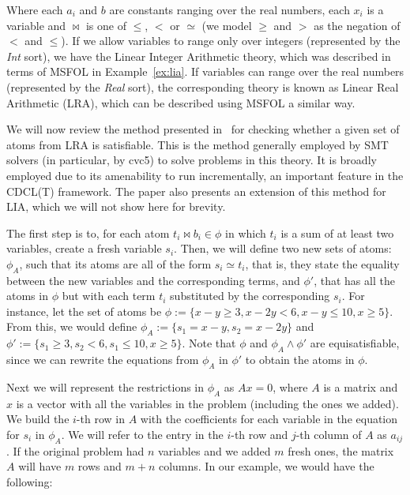 Where each $a_{i}$ and $b$ are constants ranging over the real numbers, each $x_{i}$ is a variable and $\bowtie$ is one of $\le$, $<$ or $\simeq$ (we model $\ge$ and $>$ as the negation of $<$ and $\le$). If we allow variables to range only over integers (represented by the \textit{Int} sort), we have the Linear Integer Arithmetic theory, which was described in terms of MSFOL in Example~\ref{ex:lia}. If variables can range over the real numbers (represented by the \textit{Real} sort), the corresponding theory is known as Linear Real Arithmetic (LRA), which can be described using MSFOL a similar way.

We will now review the method presented in~\cite{simplex_dpllt} for checking whether a given set of atoms from LRA is satisfiable. This is the method generally employed by SMT solvers (in particular, by cvc5) to solve problems in this theory. It is broadly employed due to its amenability to run incrementally, an important feature in the CDCL(T) framework. The paper also presents an extension of this method for LIA, which we will not show here for brevity.

The first step is to, for each atom $t_{i} \bowtie b_{i} \in \phi$ in which $t_{i}$ is a sum of at least two variables, create a fresh variable $s_{i}$. Then, we will define two new sets of atoms: $\phi_{A}$, such that its atoms are all of the form $s_{i} \simeq t_{i}$, that is, they state the equality between the new variables and the corresponding terms, and $\phi'$, that has all the atoms in $\phi$ but with each term $t_{i}$ substituted by the corresponding $s_{i}$. For instance, let the set of atoms be
$\phi := \{x - y \ge 3, x - 2y < 6, x - y \le 10, x \ge 5\}$.  From this, we would define $\phi_{A} := \{s_{1} = x - y, s_{2} = x - 2y\}$ and $\phi' := \{s_{1} \ge 3, s_{2} < 6, s_{1} \le 10, x \ge 5\}$. Note that $\phi$ and $\phi_{A} \wedge \phi'$ are equisatisfiable, since we can rewrite the equations from $\phi_{A}$ in $\phi'$ to obtain the atoms in $\phi$.

Next we will represent the restrictions in $\phi_{A}$ as $Ax = 0$, where $A$ is a matrix and $x$ is a vector with all the variables in the problem (including the ones we added). We build the $i$-th row in $A$ with the coefficients for each variable in the equation for $s_{i}$ in $\phi_{A}$. We will refer to the entry in the $i$-th row and $j$-th column of $A$ as $a_{ij}$. If the original problem had $n$ variables and we added $m$ fresh ones, the matrix $A$ will have $m$ rows and $m + n$ columns. In our example, we would have the following:


